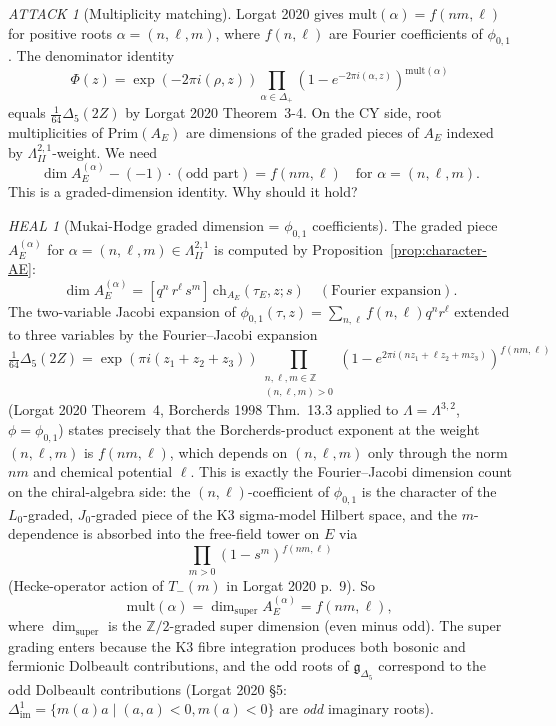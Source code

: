 \documentclass[11pt]{amsart}
\providecommand{\Z}{\mathbb{Z}}
\providecommand{\gDelta}{\mathfrak{g}_{\Delta_5}}
\providecommand{\Lat}{\Lambda}
\providecommand{\Prim}{\mathrm{Prim}}
\providecommand{\mult}{\mathrm{mult}}
\theoremstyle{plain}
\theoremstyle{definition}
\theoremstyle{remark}
\newtheorem*{attack}{ATTACK}
\newtheorem*{heal}{HEAL}
\begin{document}
\begin{attack}[Multiplicity matching]
Lorgat 2020 gives $\mult(\alpha)=f(nm,\ell)$ for positive roots
$\alpha=(n,\ell,m)$, where $f(n,\ell)$ are Fourier coefficients of
$\phi_{0,1}$. The denominator identity
\[
\Phi(z) = \exp(-2\pi i(\rho,z))\prod_{\alpha\in\Delta_+}(1-e^{-2\pi
i(\alpha,z)})^{\mult(\alpha)}
\]
equals $\tfrac{1}{64}\Delta_5(2Z)$ by Lorgat 2020 Theorem~3-4. On the
CY side, root multiplicities of $\Prim(A_E)$ are dimensions of the
graded pieces of $A_E$ indexed by $\Lat^{2,1}_{II}$-weight. We need
\[
\dim A_E^{(\alpha)} - (-1)\cdot(\text{odd part}) = f(nm,\ell)
\quad\text{for } \alpha=(n,\ell,m).
\]
This is a graded-dimension identity. Why should it hold?
\end{attack}

\begin{heal}[Mukai-Hodge graded dimension = $\phi_{0,1}$ coefficients]
\label{heal:multiplicities}
The graded piece $A_E^{(\alpha)}$ for $\alpha=(n,\ell,m)\in\Lat^{2,1}_{II}$
is computed by Proposition~\ref{prop:character-AE}:
\[
\dim A_E^{(\alpha)} = [q^n\, r^\ell\, s^m]\,\mathrm{ch}_{A_E}(\tau_E,z;s)
\quad(\text{Fourier expansion}).
\]
The two-variable Jacobi expansion of $\phi_{0,1}(\tau,z)=\sum_{n,\ell}
f(n,\ell)q^n r^\ell$ extended to three variables by the Fourier--Jacobi
expansion
\[
\tfrac{1}{64}\Delta_5(2Z) = \exp(\pi i(z_1+z_2+z_3))\!\!\!\prod_{\substack{n,\ell,m\in\Z\\(n,\ell,m)>0}}
\!\!(1-e^{2\pi i(nz_1+\ell z_2+mz_3)})^{f(nm,\ell)}
\]
(Lorgat 2020 Theorem~4, Borcherds 1998 Thm.~13.3 applied to
$\Lambda=\Lat^{3,2}$, $\phi=\phi_{0,1}$) states precisely that the
Borcherds-product exponent at the weight $(n,\ell,m)$ is
$f(nm,\ell)$, which depends on $(n,\ell,m)$ only through the norm
$nm$ and chemical potential $\ell$. This is exactly
the Fourier--Jacobi dimension count on the chiral-algebra side: the
$(n,\ell)$-coefficient of $\phi_{0,1}$ is the character of the
$L_0$-graded, $J_0$-graded piece of the K3 sigma-model Hilbert space, and
the $m$-dependence is absorbed into the free-field tower on $E$ via
\[
\prod_{m>0}(1-s^m)^{f(nm,\ell)}
\]
(Hecke-operator action of $T_-(m)$ in Lorgat 2020 p.~9). So
\[
\mult(\alpha) = \dim_{\mathrm{super}} A_E^{(\alpha)} = f(nm,\ell),
\]
where $\dim_{\mathrm{super}}$ is the $\Z/2$-graded super dimension
(even minus odd). The super grading enters because the K3 fibre
integration produces both bosonic and fermionic Dolbeault contributions,
and the odd roots of $\gDelta$ correspond to the odd Dolbeault
contributions (Lorgat 2020 \S5: $\Delta^1_{\mathrm{im}}=\{m(a)a\mid
(a,a)<0, m(a)<0\}$ are \emph{odd} imaginary roots).
\end{heal}
\end{document}
